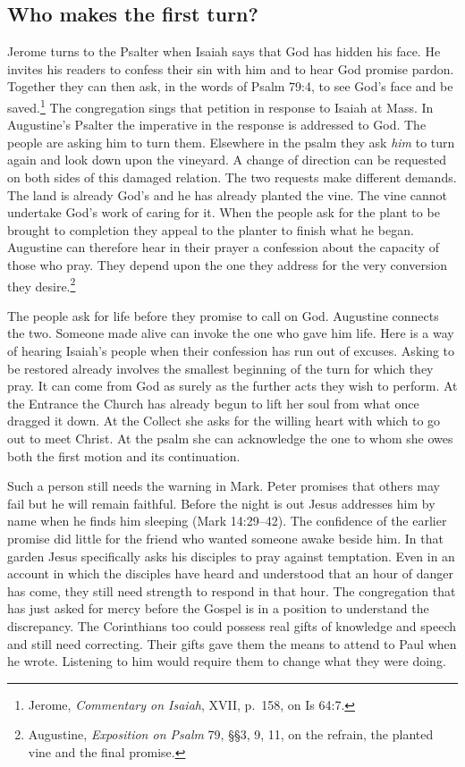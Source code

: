 \subsection{Who makes the first turn?}

Jerome turns to the Psalter when Isaiah says that God has hidden his face. He invites his readers to confess their sin with him and to hear God promise pardon. Together they can then ask, in the words of Psalm 79:4, to see God's face and be saved.\footnote{Jerome, \textit{Commentary on Isaiah}, XVII, p.~158, on Is 64:7.} The congregation sings that petition in response to Isaiah at Mass. In Augustine's Psalter the imperative in the response is addressed to God. The people are asking him to turn them. Elsewhere in the psalm they ask \emph{him} to turn again and look down upon the vineyard. A change of direction can be requested on both sides of this damaged relation. The two requests make different demands. The land is already God's and he has already planted the vine. The vine cannot undertake God's work of caring for it. When the people ask for the plant to be brought to completion they appeal to the planter to finish what he began. Augustine can therefore hear in their prayer a confession about the capacity of those who pray. They depend upon the one they address for the very conversion they desire.\footnote{Augustine, \textit{Exposition on Psalm} 79, §§3, 9, 11, on the refrain, the planted vine and the final promise.}

The people ask for life before they promise to call on God. Augustine connects the two. Someone made alive can invoke the one who gave him life. Here is a way of hearing Isaiah's people when their confession has run out of excuses. Asking to be restored already involves the smallest beginning of the turn for which they pray. It can come from God as surely as the further acts they wish to perform. At the Entrance the Church has already begun to lift her soul from what once dragged it down. At the Collect she asks for the willing heart with which to go out to meet Christ. At the psalm she can acknowledge the one to whom she owes both the first motion and its continuation.

Such a person still needs the warning in Mark. Peter promises that others may fail but he will remain faithful. Before the night is out Jesus addresses him by name when he finds him sleeping (Mark 14:29--42). The confidence of the earlier promise did little for the friend who wanted someone awake beside him. In that garden Jesus specifically asks his disciples to pray against temptation. Even in an account in which the disciples have heard and understood that an hour of danger has come, they still need strength to respond in that hour. The congregation that has just asked for mercy before the Gospel is in a position to understand the discrepancy. The Corinthians too could possess real gifts of knowledge and speech and still need correcting. Their gifts gave them the means to attend to Paul when he wrote. Listening to him would require them to change what they were doing.

